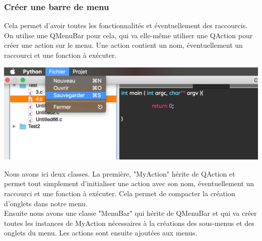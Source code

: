 \documentclass[a4paper,12pt]{article}
\begin{document}
			
			\subsubsection*{Créer une barre de menu}
			 Cela permet d'avoir toutes les fonctionnalités et éventuellement des raccourcis. On utilise une QMenuBar pour cela, qui va elle-même utiliser une QAction pour créer une action sur le menu. Une action contient un nom, éventuellement un raccourci et une fonction à exécuter. \\
			\begin{center}
				\includegraphics[scale=0.6]{images/QMenuBar}
				\vspace{0.5cm}
			\end{center}
			Nous avons ici deux classes. La première, "MyAction" hérite de QAction et permet tout simplement d'initialiser une action avec son nom, éventuellement un raccourci et une fonction à exécuter. Cela permet de compacter la création d'onglets dans notre menu.\\
			Ensuite nous avons une classe "MenuBar" qui hérite de QMenuBar et qui va créer toutes les instances de MyAction nécessaires à la créations des sous-menus et des onglets du menu. Les actions sont ensuite ajoutées aux menus.\\
			
			
\end{document}
